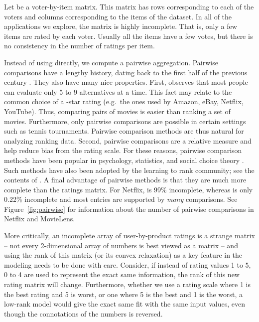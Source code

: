 \documentclass{sig-alternate}
\renewcommand{\cite}{\citep}
\begin{document}
Let  be a voter-by-item matrix.  This matrix has  rows corresponding
to each of the  voters and  columns corresponding to the  items
of the dataset.  In all of the applications we explore, the matrix 
 is highly incomplete.  That is, only a few items are rated by
each voter.  Usually all the items have a few votes, but there is
no consistency in the number of ratings per item.

Instead of using  directly, we compute a pairwise aggregation.  
Pairwise comparisons have a lengthy history, dating back to the 
first half of the previous century \cite{Kendall-1940-paired-comparison}.
They also have many nice properties.
First, \citet{miller1956-seven} observes that most people can evaluate only
5 to 9 alternatives at a time.  This fact may relate to the common choice
of a -star rating (e.g.\ the ones used by Amazon, eBay, 
Netflix, YouTube).  Thus, comparing pairs of
movies is easier than ranking a set of  movies.  Furthermore,
only pairwise comparisons are possible in certain settings
such as tennis tournaments. 
Pairwise comparison methods are thus natural for analyzing ranking data.
Second, pairwise comparisons are a relative measure and help reduce 
bias from the rating scale. For these reasons, pairwise
comparison methods have been popular in psychology, statistics, and social
choice theory \cite{david1988-paired,arrow1950-impossibility}. Such
methods have also been adopted by the learning to rank community;
see the contents of \citet{li2008-learning-to-rank}.
A final advantage of pairwise methods is that they are much more complete
than the ratings matrix.  For Netflix,  is 99\% incomplete, whereas
 is only 0.22\% incomplete and most entries are supported by
\emph{many} comparisons.  See Figure~\ref{fig:pairwise} for information
about the number of pairwise comparisons in Netflix and MovieLens.

More critically, an incomplete array of user-by-product ratings
is a strange matrix -- not every 2-dimensional array of
numbers is best viewed as a matrix --
and using the rank of this matrix (or its convex relaxation) as a key
feature in the modeling needs to be done with care.  Consider,
if instead of rating values 1 to 5, 0 to 4 are used to
represent the exact same information, the rank of this
new rating matrix will change.
Furthermore, whether we use a rating scale where 1 is the best
rating and 5 is worst, or one where 5 is the best
and 1 is the worst, a low-rank model would give the
exact same fit with the same input values, even
though the connotations of the numbers is reversed.
\end{document}

